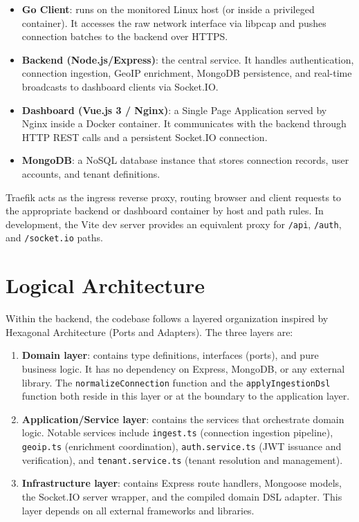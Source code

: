 \documentclass[12pt]{report}
\begin{document}
\begin{itemize}
  \item \textbf{Go Client}: runs on the monitored Linux host (or inside a
    privileged container). It accesses the raw network interface via libpcap
    and pushes connection batches to the backend over HTTPS.
  \item \textbf{Backend (Node.js/Express)}: the central service. It handles
    authentication, connection ingestion, GeoIP enrichment, MongoDB persistence,
    and real-time broadcasts to dashboard clients via Socket.IO.
  \item \textbf{Dashboard (Vue.js 3 / Nginx)}: a Single Page Application
    served by Nginx inside a Docker container. It communicates with the backend
    through HTTP REST calls and a persistent Socket.IO connection.
  \item \textbf{MongoDB}: a NoSQL database instance that stores connection
    records, user accounts, and tenant definitions.
\end{itemize}

Traefik acts as the ingress reverse proxy, routing browser and client
requests to the appropriate backend or dashboard container by host and path
rules. In development, the Vite dev server provides an equivalent proxy for
\texttt{/api}, \texttt{/auth}, and \texttt{/socket.io} paths.

\section{Logical Architecture}

Within the backend, the codebase follows a layered organization inspired by
Hexagonal Architecture (Ports and Adapters). The three layers are:

\begin{enumerate}
  \item \textbf{Domain layer}: contains type definitions, interfaces (ports),
    and pure business logic. It has no dependency on Express, MongoDB, or any
    external library. The \texttt{normalizeConnection} function and the
    \texttt{applyIngestionDsl} function both reside in this layer or at the
    boundary to the application layer.
  \item \textbf{Application/Service layer}: contains the services that
    orchestrate domain logic. Notable services include \texttt{ingest.ts}
    (connection ingestion pipeline), \texttt{geoip.ts} (enrichment
    coordination), \texttt{auth.service.ts} (JWT issuance and verification),
    and \texttt{tenant.service.ts} (tenant resolution and management).
  \item \textbf{Infrastructure layer}: contains Express route handlers,
    Mongoose models, the Socket.IO server wrapper, and the compiled domain DSL
    adapter. This layer depends on all external frameworks and libraries.
\end{enumerate}
\end{document}
